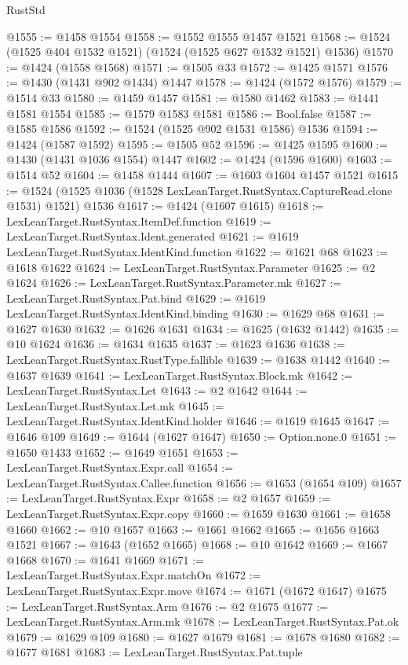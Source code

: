 \begin{lexlean}{RustStd}
\begin{coremodule}
@1555 := @1458 @1554
@1558 := @1552 @1555 @1457 @1521
@1568 := @1524 (@1525 @404 @1532 @1521) (@1524 (@1525 @627 @1532 @1521) @1536)
@1570 := @1424 (@1558 @1568)
@1571 := @1505 @33
@1572 := @1425 @1571
@1576 := @1430 (@1431 @902 @1434) @1447
@1578 := @1424 (@1572 @1576)
@1579 := @1514 @33
@1580 := @1459 @1457
@1581 := @1580 @1462
@1583 := @1441 @1581 @1554
@1585 := @1579 @1583 @1581
@1586 := Bool.false
@1587 := @1585 @1586
@1592 := @1524 (@1525 @902 @1531 @1586) @1536
@1594 := @1424 (@1587 @1592)
@1595 := @1505 @52
@1596 := @1425 @1595
@1600 := @1430 (@1431 @1036 @1554) @1447
@1602 := @1424 (@1596 @1600)
@1603 := @1514 @52
@1604 := @1458 @1444
@1607 := @1603 @1604 @1457 @1521
@1615 := @1524 (@1525 @1036 (@1528 LexLeanTarget.RustSyntax.CaptureRead.clone @1531) @1521) @1536
@1617 := @1424 (@1607 @1615)
@1618 := LexLeanTarget.RustSyntax.ItemDef.function
@1619 := LexLeanTarget.RustSyntax.Ident.generated
@1621 := @1619 LexLeanTarget.RustSyntax.IdentKind.function
@1622 := @1621 @68
@1623 := @1618 @1622
@1624 := LexLeanTarget.RustSyntax.Parameter
@1625 := @2 @1624
@1626 := LexLeanTarget.RustSyntax.Parameter.mk
@1627 := LexLeanTarget.RustSyntax.Pat.bind
@1629 := @1619 LexLeanTarget.RustSyntax.IdentKind.binding
@1630 := @1629 @68
@1631 := @1627 @1630
@1632 := @1626 @1631
@1634 := @1625 (@1632 @1442)
@1635 := @10 @1624
@1636 := @1634 @1635
@1637 := @1623 @1636
@1638 := LexLeanTarget.RustSyntax.RustType.fallible
@1639 := @1638 @1442
@1640 := @1637 @1639
@1641 := LexLeanTarget.RustSyntax.Block.mk
@1642 := LexLeanTarget.RustSyntax.Let
@1643 := @2 @1642
@1644 := LexLeanTarget.RustSyntax.Let.mk
@1645 := LexLeanTarget.RustSyntax.IdentKind.holder
@1646 := @1619 @1645
@1647 := @1646 @109
@1649 := @1644 (@1627 @1647)
@1650 := Option.none.{0}
@1651 := @1650 @1433
@1652 := @1649 @1651
@1653 := LexLeanTarget.RustSyntax.Expr.call
@1654 := LexLeanTarget.RustSyntax.Callee.function
@1656 := @1653 (@1654 @109)
@1657 := LexLeanTarget.RustSyntax.Expr
@1658 := @2 @1657
@1659 := LexLeanTarget.RustSyntax.Expr.copy
@1660 := @1659 @1630
@1661 := @1658 @1660
@1662 := @10 @1657
@1663 := @1661 @1662
@1665 := @1656 @1663 @1521
@1667 := @1643 (@1652 @1665)
@1668 := @10 @1642
@1669 := @1667 @1668
@1670 := @1641 @1669
@1671 := LexLeanTarget.RustSyntax.Expr.matchOn
@1672 := LexLeanTarget.RustSyntax.Expr.move
@1674 := @1671 (@1672 @1647)
@1675 := LexLeanTarget.RustSyntax.Arm
@1676 := @2 @1675
@1677 := LexLeanTarget.RustSyntax.Arm.mk
@1678 := LexLeanTarget.RustSyntax.Pat.ok
@1679 := @1629 @109
@1680 := @1627 @1679
@1681 := @1678 @1680
@1682 := @1677 @1681
@1683 := LexLeanTarget.RustSyntax.Pat.tuple

\end{coremodule}
\end{lexlean}
